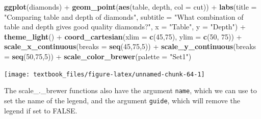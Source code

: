 \documentclass[]{tufte-book}
\newenvironment{Shaded}{}{}
\newcommand{\DataTypeTok}[1]{\textcolor[rgb]{0.56,0.13,0.00}{#1}}
\newcommand{\DecValTok}[1]{\textcolor[rgb]{0.25,0.63,0.44}{#1}}
\newcommand{\KeywordTok}[1]{\textcolor[rgb]{0.00,0.44,0.13}{\textbf{#1}}}
\newcommand{\NormalTok}[1]{#1}
\newcommand{\OperatorTok}[1]{\textcolor[rgb]{0.40,0.40,0.40}{#1}}
\newcommand{\StringTok}[1]{\textcolor[rgb]{0.25,0.44,0.63}{#1}}
\begin{document}
\begin{Shaded}
\begin{Highlighting}[]
\KeywordTok{ggplot}\NormalTok{(diamonds) }\OperatorTok{+}
\StringTok{    }\KeywordTok{geom_point}\NormalTok{(}\KeywordTok{aes}\NormalTok{(table, depth, }\DataTypeTok{col =}\NormalTok{ cut)) }\OperatorTok{+}\StringTok{ }
\StringTok{    }\KeywordTok{labs}\NormalTok{(}\DataTypeTok{title =} \StringTok{"Comparing table and depth of diamonds"}\NormalTok{,}
         \DataTypeTok{subtitle =} \StringTok{"What combination of table and depth gives good quality diamonds?"}\NormalTok{,}
         \DataTypeTok{x =} \StringTok{"Table"}\NormalTok{,}
         \DataTypeTok{y =} \StringTok{"Depth"}\NormalTok{) }\OperatorTok{+}
\StringTok{    }\KeywordTok{theme_light}\NormalTok{() }\OperatorTok{+}
\StringTok{    }\KeywordTok{coord_cartesian}\NormalTok{(}\DataTypeTok{xlim =} \KeywordTok{c}\NormalTok{(}\DecValTok{45}\NormalTok{,}\DecValTok{75}\NormalTok{), }\DataTypeTok{ylim =} \KeywordTok{c}\NormalTok{(}\DecValTok{50}\NormalTok{, }\DecValTok{75}\NormalTok{)) }\OperatorTok{+}
\StringTok{    }\KeywordTok{scale_x_continuous}\NormalTok{(}\DataTypeTok{breaks =} \KeywordTok{seq}\NormalTok{(}\DecValTok{45}\NormalTok{,}\DecValTok{75}\NormalTok{,}\DecValTok{5}\NormalTok{)) }\OperatorTok{+}
\StringTok{    }\KeywordTok{scale_y_continuous}\NormalTok{(}\DataTypeTok{breaks =} \KeywordTok{seq}\NormalTok{(}\DecValTok{50}\NormalTok{,}\DecValTok{75}\NormalTok{,}\DecValTok{5}\NormalTok{)) }\OperatorTok{+}
\StringTok{    }\KeywordTok{scale_color_brewer}\NormalTok{(}\DataTypeTok{palette =} \StringTok{"Set1"}\NormalTok{)}
\end{Highlighting}
\end{Shaded}

\texttt{[image: textbook\_files/figure-latex/unnamed-chunk-64-1]}

The scale\_.\_brewer functions also have the argument \texttt{name}, which we can use to set the name of the legend, and the argument \texttt{guide}, which will remove the legend if set to FALSE.
\end{document}
